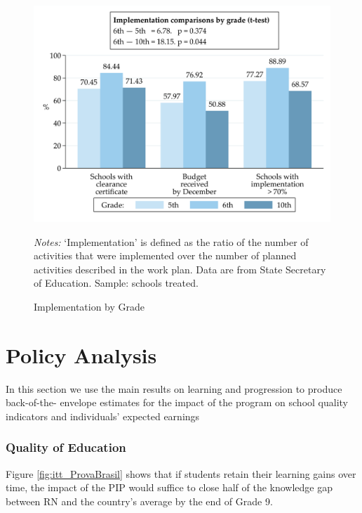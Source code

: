 \documentclass[11pt,a4paper]{article}
\begin{document}
	\begin{figure}[ht!]
		\caption{Implementation by Grade}
		\label{fig:implementation_byGrade}
		\centering
		\includegraphics[width=14cm]{DataWork/Output/Figures/fig6-implementation_byGrade.png}
		\begin{minipage}{0.825\textwidth}
			\small{\textit{Notes:} `Implementation' is defined as the ratio of the number of activities that were implemented over the number of planned activities described in the work plan. Data are from State Secretary of Education. Sample: schools treated.}
		\end{minipage}
	\end{figure}
	\FloatBarrier
	
	\clearpage
	
	\section{Policy Analysis} \label{sec:policy}
	
	In this section we use the main results on learning and progression to produce back-of-the- envelope estimates for the impact of the program on school quality indicators and individuals' expected earnings
	
	\subsubsection*{Quality of Education} 
	
	Figure \ref{fig:itt_ProvaBrasil} shows that if students retain their learning gains over time, the impact of the PIP would suffice to close half of the knowledge gap between RN and the country's average by the end of Grade 9. 
	
\end{document}

